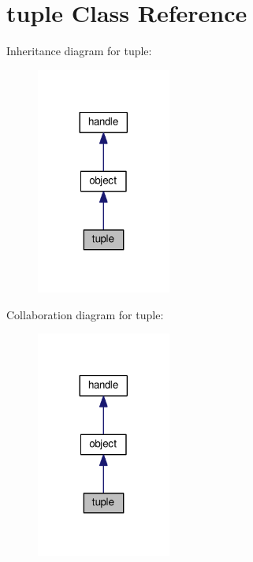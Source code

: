 \hypertarget{classtuple}{}\section{tuple Class Reference}
\label{classtuple}


Inheritance diagram for tuple\+:
\nopagebreak
\begin{figure}[H]
\begin{center}
\leavevmode
\includegraphics[width=125pt]{classtuple__inherit__graph}
\end{center}
\end{figure}


Collaboration diagram for tuple\+:
\nopagebreak
\begin{figure}[H]
\begin{center}
\leavevmode
\includegraphics[width=125pt]{classtuple__coll__graph}
\end{center}
\end{figure}
